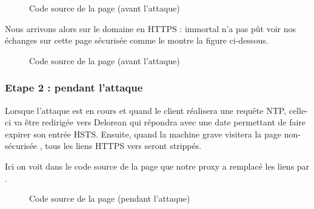 \begin{figure}[H]
  \caption{Code source de la page (avant l'attaque)}
\end{figure}

Nous arrivons alors sur le domaine  en HTTPS : immortal n'a pas pût voir nos échanges sur cette page sécurisée comme le montre la figure ci-dessous.

\begin{figure}[H]
  \caption{Code source de la page (avant l'attaque)}
\end{figure}

\subsubsection{Etape 2 : pendant l'attaque}

Lorsque l'attaque est en cours et quand le client réalisera une requête NTP, celle-ci va être redirigée vers Delorean qui répondra avec une date permettant de faire expirer son entrée HSTS. Ensuite, quand la machine grave visitera la page non-sécurisée , tous les liens HTTPS vers  seront strippés.

Ici on voit dans le code source de la page que notre proxy a remplacé les liens  par .

\begin{figure}[H]
  \caption{Code source de la page (pendant l'attaque)}
\end{figure}

